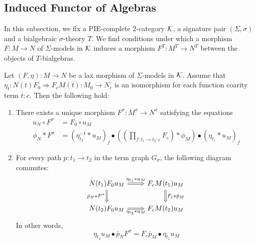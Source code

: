 \subsection{Induced Functor of Algebras}

In this subsection, we fix a PIE-complete $2$-category $\mathcal{K}$, a signature pair $(\Sigma,\sigma)$ and a bialgebraic $\sigma$-theory $T$. We find conditions under which a morphism $F\colon M\to N$ of $\Sigma$-models in $\mathcal{K}$ induces a morphism $F^T\colon M^T\to N^T$ between the objects of $T$-bialgebras. 

\begin{lemma}\label{lem:morphism_between_inserters}
   Let $(F,\eta) \colon M \to N$ be a lax morphism of $\Sigma$-models in $\mathcal{K}$. Assume that $\eta_t\colon N(t)F_0\Rightarrow F_c M(t)\colon M_0\to N_c$ is an isomorphism for each function coarity term $t\colon c$. Then the following hold:
   \begin{enumerate}
       \item There exists a unique morphism $F^\sigma\colon M^\sigma\to N^\sigma$ satisfying the equations
       \begin{align}
           u_N \circ F^\sigma
           &= F_0 \circ u_M \nonumber \\
           \phi_N * F^\sigma
           &= (\eta_{t_2}^{-1}*u_M)_f \bullet ((\prod_{f\colon t_1\to t_2\colon c} F_{c}) * \phi_M) \bullet (\eta_{t_1}*u_M)_f\label{eq:2}
   \end{align}
       \item For every path $p\colon t_1\to t_2$ in the term graph $G_\sigma$, the following diagram commutes:
       \[
\begin{tikzcd}
N(t_1)F_0u_M \arrow[r, "\eta_{t_1}*u_M", Rightarrow] \arrow[d, "\bar{p}_N*F^\sigma"', Rightarrow] & F_cM(t_1)u_M \arrow[d, "F_c*\bar{p}_M", Rightarrow] \\
N(t_2)F_0u_M \arrow[r, "\eta_{t_2}*u_M"', Rightarrow]                                             & F_cM(t_2)u_M
\end{tikzcd}
\]
In other words,
\begin{equation}\label{eq:3}
\eta_{t_2}u_M\bullet \bar{p}_NF^\sigma = F_c\bar{p}_M\bullet \eta_{t_1}u_M
\end{equation}

   \end{enumerate}
\end{lemma}
